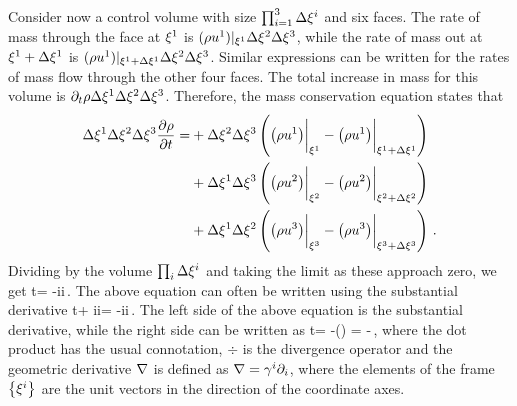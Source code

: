 Consider now a control volume with size $\prod_{i = 1}^3\Delta{\xi}^{i}$ and six faces. The rate of mass through the face at ${\xi}^{1}$ is $(\rho{u}^{1})|_{{\xi}^{1}}\Delta{\xi}^{2}\Delta{\xi}^{3}$, while the rate of mass out at ${\xi}^{1} + \Delta{\xi}^{1}$ is $(\rho{u}^{1})|_{{\xi}^{1} + \Delta{\xi}^{1}}\Delta{\xi}^{2}\Delta{\xi}^{3}$. Similar expressions can be written for the rates of mass flow through the other four faces. The total increase in mass for this volume is $\partial_{t}\rho\Delta{\xi}^{1}\Delta{\xi}^{2}\Delta{\xi}^{3}$. Therefore, the mass conservation equation states that
\begin{align*}
\Delta{\xi}^{1}\Delta{\xi}^{2}\Delta{\xi}^{3} \dfrac{\partial{\rho}}{\partial{t}} =
    &+ \Delta{\xi}^{2}\Delta{\xi}^{3}
      \left(
          \left(\rho{u}^{1}\right)\biggr\rvert_{{\xi}^{1}} -
          \left(\rho{u}^{1}\right)\biggr\rvert_{{\xi}^{1} + \Delta{\xi}^{1}} 
      \right) \\
    &+ \Delta{\xi}^{1}\Delta{\xi}^{3}
      \left(
          \left(\rho{u}^{2}\right)\biggr\rvert_{{\xi}^{2}} -
          \left(\rho{u}^{2}\right)\biggr\rvert_{{\xi}^{2} + \Delta{\xi}^{2}} 
      \right) \\
    &+ \Delta{\xi}^{1}\Delta{\xi}^{2}
      \left(
          \left(\rho{u}^{3}\right)\biggr\rvert_{{\xi}^{3}} -
          \left(\rho{u}^{3}\right)\biggr\rvert_{{\xi}^{3} + \Delta{\xi}^{3}} 
      \right)\,.
\end{align*}
Dividing by the volume $\prod_i\Delta{\xi}^{i}$ and taking the limit as these approach zero, we get
\beq
\ipd t\dens = -\ipd i\dens\fvec\vel i\,.
\eeq
The above equation can often be written using the substantial derivative
\beq
\ipd t\dens + \fvec\vel i\ipd i\dens = -\dens\ipd i\fvec\vel i\,.
\eeq
The left side of the above equation is the substantial derivative, while the right side can be written as
\beq
\ipd t\dens = -\dens\left(\gder\iprod\vel\right) = -\dens\div\vel\,,
\eeq
where the dot product has the usual connotation, $\div$ is the divergence operator and the geometric derivative $\nabla$ is defined as $\nabla = \gamma^{i}\partial_{i}$, where the elements of the frame $\left\lbrace{{\xi}^{i}}\right\rbrace$ are the unit vectors in the direction of the coordinate axes.

